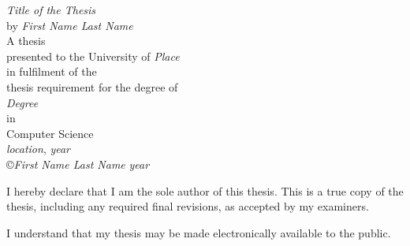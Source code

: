 
\def\title{{\em Title of the Thesis}}
\def\author{{\em First Name Last Name}}
\def\degree{{\em Degree}}
\def\year{{\em year}}
\def\location{{\em location}}
\def\university{\em Place}

\begin{titlepage}
\vspace*{3cm}
\begin{center}
\Large \title \\


\vspace{2cm} \large
by \author \\

\vspace{2cm}
A thesis \\
presented to the University of {\university} \\
in fulfilment of the \\
thesis requirement for the degree of \\
\degree \\
in \\
Computer Science \\
\vspace{2cm}
{\location}, {\year} \\
\copyright {\author} {\year}
\end{center}
\end{titlepage}

\clearpage


I hereby declare that I am the sole author of this thesis. 
This is a true copy of the thesis, including any required final revisions, 
as accepted by my examiners.


\vfill

I understand that my thesis may be made electronically available to the public.


\vfill

